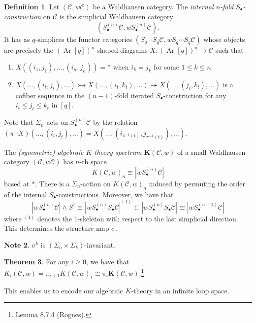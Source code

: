 \documentclass[10pt,letterpaper,cm]{nupset}
\theoremstyle{definition}
\newtheorem{definition}{Definition}[section]
\newtheorem{note}[definition]{Note}
\theoremstyle{theorem}
\newtheorem{theorem}[definition]{Theorem}
\theoremstyle{remark}
\newcommand{\1}{\mathbf{1}}
\renewcommand{\c}{\mathscr{C}}
\newcommand{\0}{\vec 0}
\DeclareMathOperator{\Ar}{Ar}
\begin{document}
\begin{definition}
Let $\left(\c,w{\c}\right)$ be a Waldhausen category. The \textit{internal $n$-fold $S_{\bullet}$-construction} on $\c$ is the simplicial Waldhausen category $$\left(S_{\bullet}^{(n)}\c, wS_{\bullet}^{(n)} \c\right).$$ It has as $q$-simplices the functor categories $\left(S_q \cdots S_q \c, wS_q \cdots S_q \c\right)$ whose objects are precisely the $\left(\Ar[q]\right)^n$-shaped diagrams  $X: \left(\Ar[q]\right)^n\to \c$ such that
\begin{enumerate}[label=(\roman*)]
\item $X((i_1, j_1), \ldots, (i_n, j_n)) = \ast$ when $i_k = j_k$ for some $1\leq k \leq n$.
\item $X(\ldots, (i_t, j_t), \ldots) \rightarrowtail X(\ldots, (i_t, k_t), \ldots) \twoheadrightarrow X(\ldots, (j_t, k_t), \ldots)$ is a cofiber sequence  in the $(n-1)$-fold iterated $S_{\bullet}$-construction for any $i_t \leq j_t \leq k_t$ in $[q]$.
\end{enumerate}
Note that $\Sigma_n$ acts on $S_{\bullet}^{(n)}\c$ by the relation $(\pi \cdot X)(\ldots, (i_t, j_t), \ldots) = X(\ldots, (i_{\pi^{{-1}}(t)}, j_{\pi^{{-1}}(t)}), \ldots)$.
\end{definition}

\medskip


The \textit{(symmetric) algebraic $K$-theory  spectrum $\mathbf{K}(\c, w)$} of a small Waldhausen category $\left(\c,w{\c}\right)$ has $n$-th space $$K(\c, w)_n \equiv \left\lvert{wS_{\bullet}^{(n)}\c}\right\rvert$$ based at $\ast$. There is a $\Sigma_n$-action on $K(\c, w)_n$ induced by permuting the order of the internal $S_{\bullet}$-constructions. Moreover, we have that $$\left\lvert{wS_{\bullet}^{(n)}\c}\right\rvert \land S^1 \cong \left\lvert{wS_{\bullet}^{(n)}S_{\bullet}\c}\right\rvert^{(1)} \subset \left\lvert{wS_{\bullet}^{(n)}S_{\bullet}\c}\right\rvert \cong \left\lvert{wS_{\bullet}^{(n+1)}\c}\right\rvert$$ where $^{(1)}$ denotes the $1$-skeleton with respect to the last simplicial direction. This determines the structure map $\sigma$.

\begin{note}
$\sigma^k$ is $\left(\Sigma_{n} \times \Sigma_{k}\right)$-invariant.
\end{note}



\begin{theorem}\label{lt}
For any $i\geq 0$, we have that $K_i(\c, w) = \pi_{i+1}K(\c, w)_1 \cong \pi_i \mathbf{K}(\c, w)$.\footnote{Lemma 8.7.4 (Rognes).}
\end{theorem}



This enables us to encode our algebraic $K$-theory in an infinite loop space.
\end{document}
